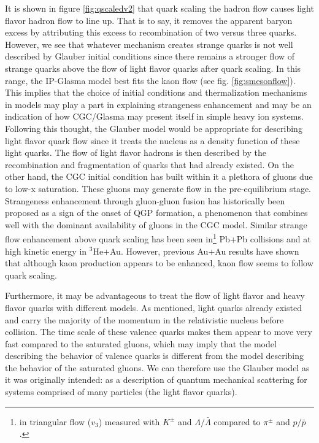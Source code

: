 It is shown in figure \ref{fig:qscaledv2} that quark scaling the hadron flow causes light flavor hadron flow to line up. That is to say, it removes the apparent baryon excess by attributing this excess to recombination of two versus three quarks. However, we see that whatever mechanism creates strange quarks is not well described by Glauber initial conditions since there remains a stronger flow of strange quarks above the flow of light flavor quarks after quark scaling. In this range, the IP-Glasma model best fits the kaon flow (see fig. \ref{fig:smesonflow}). This implies that the choice of initial conditions and thermalization mechanisms in models may play a part in explaining strangeness enhancement and may be an indication of how CGC/Glasma may present itself in simple heavy ion systems. Following this thought, the Glauber model would be appropriate for describing light flavor quark flow since it treats the nucleus as a density function of these light quarks. The flow of light flavor hadrons is then described by the recombination and fragmentation of quarks that had already existed. On the other hand, the CGC initial condition has built within it a plethora of gluons due to low-x saturation. These gluons may generate flow in the pre-equilibrium stage\citep{Krasnitz200321}. Strangeness enhancement through gluon-gluon fusion has historically been proposed as a sign of the onset of QGP formation\citep{PhysRevLett.48.1066}, a phenomenon that combines well with the dominant availability of gluons in the CGC model. Similar strange flow enhancement above quark scaling has been seen in\footnote{in triangular flow ($v_3$) measured with $K^{\pm}$ and $\Lambda/\bar{\Lambda}$ compared to $\pi^{\pm}$ and $p/\bar{p}$.} Pb+Pb collisions\citep{1742-6596-668-1-012099} and at high kinetic energy in $^3$He+Au\citep{huangQM2015}. However, previous Au+Au results have shown that although kaon production appears to be enhanced\citep{Hohne:1999jf}, kaon flow seems to follow quark scaling\citep{PhysRevC.92.034913}. 

Furthermore, it may be advantageous to treat the flow of light flavor and heavy flavor quarks with different models. As mentioned, light quarks already existed and carry the majority of the momentum in the relativistic nucleus before collision. The time scale of these valence quarks makes them appear to move very fast compared to the saturated gluons, which may imply that the model describing the behavior of valence quarks is different from the model describing the behavior of the saturated gluons. We can therefore use the Glauber model as it was originally intended: as a description of quantum mechanical scattering for systems comprised of many particles (the light flavor quarks). 

